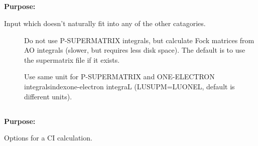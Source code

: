  
 
\pagebreak[3]
\subsection{\label{ref-auxinp}}
 
{\bf Purpose:}
 
Input which doesn't naturally fit into any of the other catagories.
 
\begin{description}
\item[]
  Do not use P-SUPERMATRIX integrals, but calculate Fock matrices
  from AO integrals (slower, but requires less disk space). The
  default is to use the supermatrix file if it exists.

\item[]
  Use same unit for P-SUPERMATRIX and ONE-ELECTRON
  integralsindex{one-electron integraL}
  (LUSUPM=LUONEL, default is different units).
\end{description}

\pagebreak[3]
\subsection{\label{ref-cicinp}}
 
{\bf Purpose:}
 
Options for a CI calculation.
 
